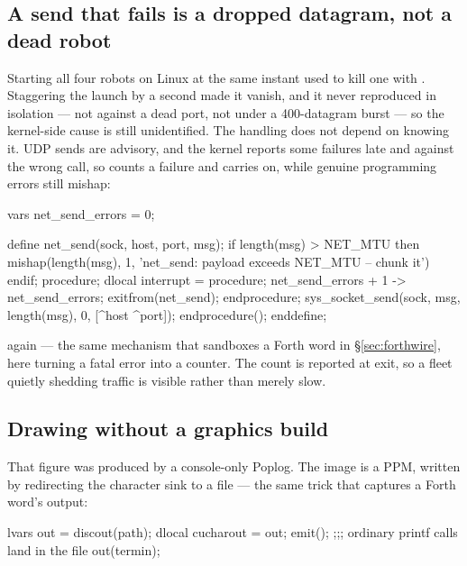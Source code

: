 \subsection{A send that fails is a dropped datagram, not a dead robot}

Starting all four robots on Linux at the same instant used to kill one with
. Staggering
the launch by a second made it vanish, and it never reproduced in isolation
--- not against a dead port, not under a 400-datagram burst --- so the
kernel-side cause is still unidentified. The handling does not depend on
knowing it. UDP sends are advisory, and the kernel reports some failures late
and against the wrong call, so  counts a failure and carries
on, while genuine programming errors still mishap:

\begin{pop}
vars net_send_errors = 0;

define net_send(sock, host, port, msg);
    if length(msg) > NET_MTU then
        mishap(length(msg), 1, 'net_send: payload exceeds NET_MTU -- chunk it')
    endif;
    procedure;
        dlocal interrupt =
            procedure;
                net_send_errors + 1 -> net_send_errors;
                exitfrom(net_send);
            endprocedure;
        sys_socket_send(sock, msg, length(msg), 0, [^host ^port]);
    endprocedure();
enddefine;
\end{pop}

\noindent {} again --- the same mechanism that sandboxes
a Forth word in \S\ref{sec:forthwire}, here turning a fatal error into a
counter. The count is reported at exit, so a fleet quietly shedding traffic
is visible rather than merely slow.

\subsection{Drawing without a graphics build}

That figure was produced by a console-only Poplog. The image is a PPM,
written by redirecting the character sink to a file --- the same
 trick that captures a Forth word's output:

\begin{pop}
lvars out = discout(path);
dlocal cucharout = out;
emit();                         ;;; ordinary printf calls land in the file
out(termin);
\end{pop}

